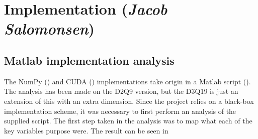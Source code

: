 \section{Implementation (\textit{Jacob Salomonsen})}


\subsection{Matlab implementation analysis}
The NumPy () and CUDA () implementations take origin in a Matlab script (). The analysis has been made on the D2Q9 version, but the D3Q19 is just an extension of this with an extra dimension. Since the project relies on a black-box implementation scheme, it was necessary to first perform an analysis of the supplied script. The first step taken in the analysis was to map what each of the key variables purpose were. The result can be seen in 

